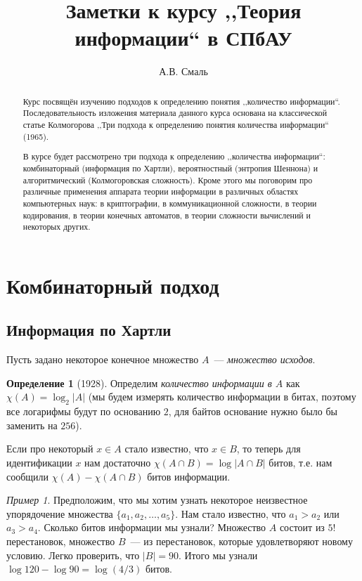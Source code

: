 \documentclass[12pt]{article}
\title{Заметки к курсу ,,Теория информации`` в СПбАУ}
\author{А.В. Смаль}
\newcommand{\seqn}[2]{{#1}_1,{#1}_2,\dotsc,{#1}_{#2}}
\theoremstyle{definition}
\newtheorem{definition}{Определение}
\theoremstyle{plain}
\theoremstyle{remark}
\newtheorem{example}{Пример}[section]
\begin{document}
\maketitle

\begin{abstract}
Курс посвящён изучению подходов к определению понятия  ,,количество информации``. 
Последовательность изложения материала данного курса основана на классической статье Колмогорова ,,Три подхода к
определению понятия количества информации`` (1965).

В курсе будет рассмотрено три подхода к определению ,,количества информации``: 
комбинаторный (информация по Хартли), вероятностный (энтропия Шеннона) и 
алгоритмический (Колмогоровская сложность). Кроме этого мы поговорим про
различные применения аппарата теории информации в различных областях компьютерных наук:
в криптографии, в коммуникационной сложности, в теории кодирования, 
в теории конечных автоматов, в теории сложности вычислений и некоторых других.
\end{abstract}

\newpage\tableofcontents\newpage

\section{Комбинаторный подход}
\subsection{Информация по Хартли}
Пусть задано некоторое конечное множество \(A\)~--- \emph{множество исходов}.
\begin{definition}[1928]
Определим \emph{количество информации в \(A\)} как \(\chi(A) = \log_2|A|\) (мы будем измерять количество информации в битах, поэтому все логарифмы будут по основанию \(2\), для байтов основание нужно было бы заменить на \(256\)).
\end{definition}

Если про некоторый \(x\in A\) стало известно, что \(x\in B\), то теперь для идентификации \(x\) нам достаточно \(\chi(A\cap B) = \log |A\cap B|\) битов, т.е. нам сообщили \(\chi(A) - \chi(A\cap B)\) битов информации.

\begin{example}
    Предположим, что мы хотим узнать некоторое неизвестное упорядочение множества $\{\seqn{a}{5}\}$. Нам стало известно,
    что \(a_1>a_2\) или \(a_3>a_4\). Сколько битов информации мы узнали? Множество \(A\) состоит из \(5!\) перестановок,
    множество \(B\)~--- из перестановок, которые удовлетворяют новому условию. Легко проверить, что \(|B| = 90\). Итого
    мы узнали \(\log 120 - \log 90 = \log(4/3)\) битов.
\end{example}
\end{document}
